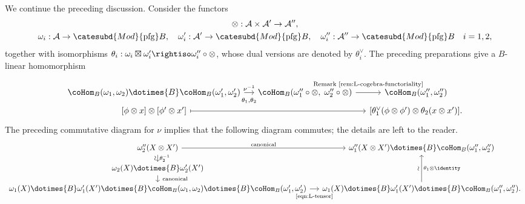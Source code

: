 We continue the preceding discussion. Consider the functors
\begin{gather*}
	\otimes: \mathcal{A} \times \mathcal{A}' \to \mathcal{A}'' , \\
	\omega_i: \mathcal{A} \to \catesubd{Mod}{\mathrm{pfg}}B, \quad \omega'_i: \mathcal{A}' \to \catesubd{Mod}{\mathrm{pfg}}B, \quad \omega''_i: \mathcal{A}'' \to \catesubd{Mod}{\mathrm{pfg}}B \quad i =1, 2,
\end{gather*}
together with isomorphisms $\theta_i: \omega_i \boxtimes \omega'_i \rightiso \omega''_i \circ \otimes$, whose dual versions are denoted by $\theta_i^\vee$. The preceding preparations give a $B$-linear homomorphism
\begin{equation}\label{eqn:L-tensor}
	\begin{tikzcd}[row sep=tiny, column sep=small]
		\coHom_B(\omega_1, \omega_2) \dotimes{B} \coHom_B(\omega'_1, \omega'_2) \arrow[r, "{\nu^{-1}}", "{\theta_1, \theta_2}"' inner sep=0.6em] & \coHom_B(\omega''_1 \circ \otimes, \; \omega''_2 \circ \otimes) \arrow[r, "{\text{Remark \ref{rem:L-cogebra-functoriality}}}" inner sep=0.6em] & \coHom_B(\omega''_1, \omega''_2) \\
		{[\phi \otimes x]} \otimes {[\phi' \otimes x']} \arrow[mapsto, rr] & & {\left[ \theta_1^\vee(\phi \otimes \phi') \otimes \theta_2(x \otimes x') \right]} .
	\end{tikzcd}
\end{equation}
The preceding commutative diagram for $\nu$ implies that the following diagram commutes; the details are left to the reader.
\begin{equation}\label{eqn:L-bialgebra-prod}
	\begin{tikzcd}[row sep=small, column sep=small]
		\omega''_2(X \otimes X') \arrow[d, "{\theta_2^{-1}}", "\sim"' sloped] \arrow[r, "\text{canonical}"] & \omega''_1(X \otimes X') \dotimes{B} \coHom_B(\omega''_1, \omega''_2) \\
		\omega_2(X) \dotimes{B} \omega'_2(X') \arrow[d, "\text{canonical}" inner sep=0.6em] &  \\
		\omega_1(X) \dotimes{B} \omega'_1(X') \dotimes{B} \coHom_B(\omega_1, \omega_2) \dotimes{B} \coHom_B(\omega'_1, \omega'_2) \arrow[r, "\text{\eqref{eqn:L-tensor}}"' inner sep=0.6em] & \omega_1(X) \dotimes{B} \omega'_1(X') \dotimes{B} \coHom_B(\omega''_1, \omega''_2). \arrow[uu, "{\theta_1 \otimes \identity}"', "\sim" sloped]
	\end{tikzcd}
\end{equation}

